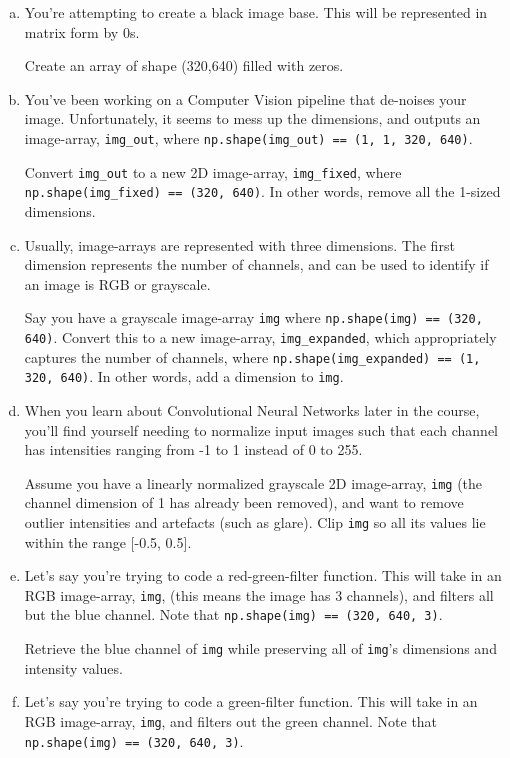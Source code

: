 \begin{enumerate}[a.]
    \item You're attempting to create a black image base. This will be represented in matrix form by 0s. 
    
    Create an array of shape (320,640) filled with zeros.
    \item You've been working on a Computer Vision pipeline that de-noises your image. Unfortunately, it seems to mess up the dimensions, and outputs an image-array, \texttt{img\_out}, where \texttt{np.shape(img\_out) == (1, 1, 320, 640)}. 
    
    Convert \texttt{img\_out} to a new 2D image-array, \texttt{img\_fixed}, where \texttt{np.shape(img\_fixed) == (320, 640)}. In other words, remove all the 1-sized dimensions.
    \item Usually, image-arrays are represented with three dimensions. The first dimension represents the number of channels, and can be used to identify if an image is RGB or grayscale. 
    
    Say you have a grayscale image-array \texttt{img} where \texttt{np.shape(img) == (320, 640)}. Convert this to a new image-array, \texttt{img\_expanded}, which appropriately captures the number of channels, where \texttt{np.shape(img\_expanded) == (1, 320, 640)}. In other words, add a dimension to \texttt{img}.
    \item When you learn about Convolutional Neural Networks later in the course, you'll find yourself needing to normalize input images such that each channel has intensities ranging from -1 to 1 instead of 0 to 255.
    
    Assume you have a linearly normalized grayscale 2D image-array, \texttt{img} (the channel dimension of 1 has already been removed), and want to remove outlier intensities and artefacts (such as glare). Clip \texttt{img} so all its values lie within the range [-0.5, 0.5].
    \item Let's say you're trying to code a red-green-filter function. This will take in an RGB image-array, \texttt{img}, (this means the image has 3 channels), and filters all but the blue channel. Note that \texttt{np.shape(img) == (320, 640, 3)}.
    
    Retrieve the blue channel of \texttt{img} while preserving all of \texttt{img}'s dimensions and intensity values.
    
    \item Let's say you're trying to code a green-filter function. This will take in an RGB image-array, \texttt{img}, and filters out the green channel. Note that \texttt{np.shape(img) == (320, 640, 3)}. 
    

\end{enumerate}
